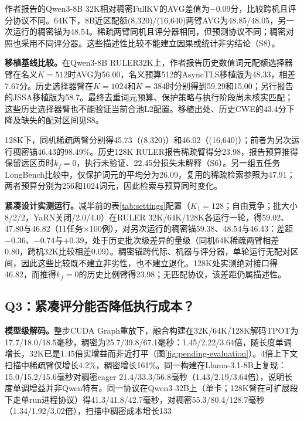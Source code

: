 \documentclass[conference,9pt,letterpaper]{IEEEtran}
\begin{document}
作者报告的Qwen3-8B 32K相对稠密FullKV的AVG差值为$-0.09$分，比较跨机且评分协议不同。64K下，8B近区配额(8,320)/(16,640)两臂AVG为48.85/48.05，另一次运行的稠密锚为48.54。稀疏两臂同机且评分器相同，但预测协议不同；稠密对照也采用不同评分器。这些描述性比较不能建立因果或统计非劣结论（S8）。

\textbf{移植基线比较。}在Qwen3-8B RULER32K上，作者报告历史数值词元配额选择器臂在名义$K=512$时AVG为56.00，名义预算512的AsyncTLS移植版为48.33，相差7.67分。历史选择器臂在$K=1024$和$K=384$时分别得到59.29和15.00；另行报告的JSSA移植版为58.7。最终去重词元预算、保护策略与执行阶段尚未核实匹配；这些历史选择器臂也不能验证当前合池L2配置。移植出处、历史CWE的43.4分下降及缺失的配对区间见S8。

128K下，同机稀疏两臂分别得45.73（(8,320)）和46.02（(16,640)）；前者为另次运行稠密锚46.43的98.49\%。历史128K RULER报告稀疏臂得分23.98，报告预算推得保留远区页时$k_f=0$，执行未验证、22.45分损失未解释（S6）。另一组五任务LongBench比较中，仅保护词元的平均分为26.09，复用的稀疏检索参照为47.91；两者预算分别为256和1024词元，因此检索与预算同时变化。

\textbf{紧凑设计实测运行。}减半前的表\ref{tab:settings}配置（$K_1{=}128$；自由竞争；批大小8/2/2，YaRN关闭/2.0/4.0）在RULER 32K/64K/128K各运行一轮，得59.02、47.80与46.82（11任务×100例），对另次运行的稠密锚59.38、48.54与46.43：差距$-0.36$、$-0.74$与$+0.39$，处于历史批次级差异的量级（同机64K稀疏两臂相差0.80，跨机32K比较相差0.09）。稠密锚跨代际、机器与评分器，单轮运行无配对区间，因此这些比较既不建立非劣性，也不建立退化。128K处实测绝对接口得46.82，而推得$k_f=0$的历史比例臂得23.98；无匹配协议，该差距仍属描述性。

\subsection{Q3：紧凑评分能否降低执行成本？}
\textbf{模型级解码。}整步CUDA Graph重放下，融合构建在32K/64K/128K解码TPOT为17.7/18.0/18.5毫秒，稠密为25.7/39.8/67.1毫秒：1.45/2.22/3.64倍，随长度单调增长，32K已是1.45倍实增益而非近打平（图\ref{fig:pending-evaluation}）。4倍上下文扫描中稀疏臂仅增长4.2\%，稠密增长161\%。同一构建在Llama-3.1-8B上复现：15.0/15.2/15.6毫秒对稠密eager 21.4/33.3/56.8毫秒（1.43/2.19/3.64倍），说明长度单调增益并非Qwen特有。同一协议在Qwen3-32B上（单卡；128K臂在可扩展段下走单run进程协议）得41.3/41.8/42.7毫秒，对稠密55.3/80.4/128.7毫秒（1.34/1.92/3.02倍），扫描中稠密成本增长133\\%
\end{document}

